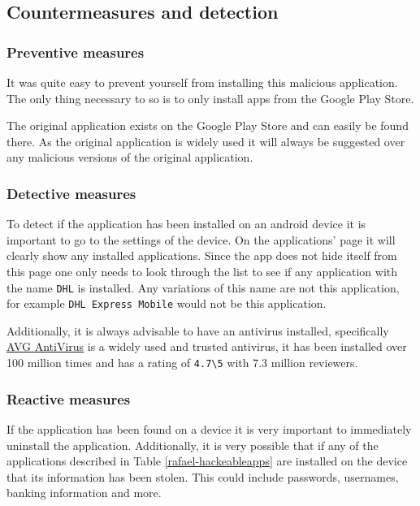 \subsection{Countermeasures and detection}

\subsubsection{Preventive measures}

It was quite easy to prevent yourself from installing this malicious application.
The only thing necessary to so is to only install apps from the Google Play Store.

The original application exists on the Google Play Store and can easily be found there.
As the original application is widely used it will always be suggested over any malicious versions of the original application.

\subsubsection{Detective measures}

To detect if the application has been installed on an android device it is important to go to the settings of the device.
On the applications' page it will clearly show any installed applications.
Since the app does not hide itself from this page one only needs to look through the list to see if any application with the name \texttt{DHL} is installed.
Any variations of this name are not this application, for example \texttt{DHL Express Mobile} would not be this application.

Additionally, it is always advisable to have an antivirus installed,
specifically \href{https://play.google.com/store/apps/details?id=com.antivirus&hl=en&gl=US}{AVG AntiVirus} is a widely used and trusted antivirus,
it has been installed over 100 million times and has a rating of \texttt{4.7\textbackslash5} with 7.3 million reviewers.

\subsubsection{Reactive measures}

If the application has been found on a device it is very important to immediately uninstall the application.
Additionally, it is very possible that if any of the applications described in Table \ref{rafael-hackeableapps} are installed on the device that its information has been stolen.
This could include passwords, usernames, banking information and more.

